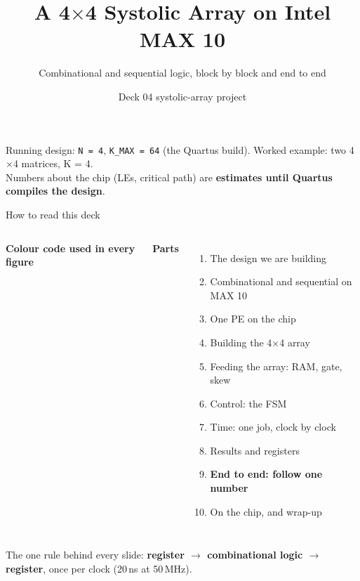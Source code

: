 \documentclass[aspectratio=169,11pt]{beamer}
\title{\textcolor{pcb}{A 4$\times$4 Systolic Array on Intel MAX 10}}
\subtitle{Combinational and sequential logic, block by block and end to end}
\author{Deck 04 \textperiodcentered{} systolic-array project}
\date{}
\newcommand{\sig}[1]{\texttt{#1}}
\begin{document}
\begin{frame}
  \titlepage
  \centering\color{muted}\small
  Running design: \sig{N = 4}, \sig{K\_MAX = 64} (the Quartus build).
  Worked example: two 4$\times$4 matrices, K = 4.\\
  Numbers about the chip (LEs, critical path) are \textbf{estimates until Quartus compiles the design}.
\end{frame}

\begin{frame}{How to read this deck}
  \begin{columns}[T]
    \textbf{Colour code used in every figure}\\[2mm]
    \small
    \textbf{Parts}
    \begin{enumerate}
      \item The design we are building
      \item Combinational and sequential on MAX 10
      \item One PE on the chip
      \item Building the 4$\times$4 array
      \item Feeding the array: RAM, gate, skew
      \item Control: the FSM
      \item Time: one job, clock by clock
      \item Results and registers
      \item \textbf{End to end: follow one number}
      \item On the chip, and wrap-up
    \end{enumerate}
  \end{columns}
  \vspace{2mm}
  \begin{center}
  \colorbox{coppert}{\parbox{0.9\textwidth}{\centering\small The one rule behind every slide:
  \textbf{register $\rightarrow$ combinational logic $\rightarrow$ register}, once per clock (20\,ns at 50\,MHz).}}
  \end{center}
\end{frame}
\end{document}
